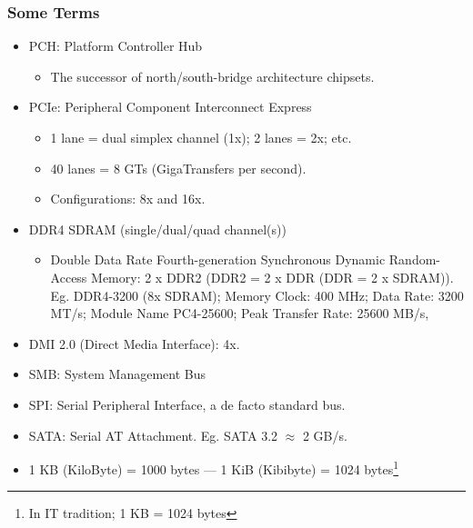 \documentclass[xcolor=table, notheorems, hyperref={pdfpagelabels=false}]{beamer}
\begin{document}
\begin{frame}
\frametitle{Some Terms}
\begin{itemize}
\item PCH: Platform Controller Hub
\begin{itemize}
\item The successor of north/south-bridge architecture chipsets.
\end{itemize}
\item PCIe: Peripheral Component Interconnect Express
\begin{itemize}
\item 1 lane = dual simplex channel (1x); 2 lanes = 2x; etc.
\item 40 lanes = 8 GTs (GigaTransfers per second).
\item Configurations: 8x and 16x.
\end{itemize}
\item DDR4 SDRAM (single/dual/quad channel(s))
\begin{itemize}
\item Double Data Rate Fourth-generation Synchronous Dynamic Random-Access Memory:
      2 x DDR2 (DDR2 = 2 x DDR (DDR = 2 x SDRAM)).
      Eg. DDR4-3200 (8x SDRAM); Memory Clock: 400 MHz; Data Rate: 3200 MT/s; Module Name PC4-25600;
      Peak Transfer Rate: 25600 MB/s,
\end{itemize}
\item DMI 2.0 (Direct Media Interface): 4x.
\item SMB: System Management Bus
\item SPI: Serial Peripheral Interface, a de facto standard bus.
\item SATA:  Serial AT Attachment. Eg. SATA 3.2 $\approx$ 2 GB/s.
\item 1 KB (KiloByte) = 1000 bytes --- 1 KiB (Kibibyte) = 1024 bytes\footnote{%
      In IT tradition; 1 KB = 1024 bytes}
\end{itemize}
\end{frame}

\end{document}
